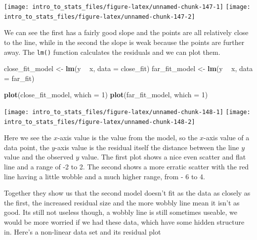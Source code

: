 \documentclass[
]{book}
\newenvironment{Shaded}{\begin{snugshade}}{\end{snugshade}}
\newcommand{\DataTypeTok}[1]{\textcolor[rgb]{0.13,0.29,0.53}{#1}}
\newcommand{\DecValTok}[1]{\textcolor[rgb]{0.00,0.00,0.81}{#1}}
\newcommand{\KeywordTok}[1]{\textcolor[rgb]{0.13,0.29,0.53}{\textbf{#1}}}
\newcommand{\NormalTok}[1]{#1}
\newcommand{\OperatorTok}[1]{\textcolor[rgb]{0.81,0.36,0.00}{\textbf{#1}}}
\newcommand{\StringTok}[1]{\textcolor[rgb]{0.31,0.60,0.02}{#1}}
\begin{document}
\texttt{[image: intro\_to\_stats\_files/figure-latex/unnamed-chunk-147-1]} \texttt{[image: intro\_to\_stats\_files/figure-latex/unnamed-chunk-147-2]}

We can see the first has a fairly good slope and the points are all relatively close to the line, while in the second the slope is weak because the points are further away. The \texttt{lm()} function calculates the residuals and we can plot them.

\begin{Shaded}
\begin{Highlighting}[]
\NormalTok{close_fit_model <-}\StringTok{ }\KeywordTok{lm}\NormalTok{(y }\OperatorTok{~}\StringTok{ }\NormalTok{x, }\DataTypeTok{data =}\NormalTok{ close_fit)}
\NormalTok{far_fit_model <-}\StringTok{ }\KeywordTok{lm}\NormalTok{(y }\OperatorTok{~}\StringTok{ }\NormalTok{x, }\DataTypeTok{data =}\NormalTok{ far_fit)}

\KeywordTok{plot}\NormalTok{(close_fit_model, }\DataTypeTok{which =} \DecValTok{1}\NormalTok{)}
\KeywordTok{plot}\NormalTok{(far_fit_model, }\DataTypeTok{which =} \DecValTok{1}\NormalTok{)}
\end{Highlighting}
\end{Shaded}

\texttt{[image: intro\_to\_stats\_files/figure-latex/unnamed-chunk-148-1]} \texttt{[image: intro\_to\_stats\_files/figure-latex/unnamed-chunk-148-2]}

Here we see the \(x\)-axis value is the value from the model, so the \(x\)-axis value of a data point, the \(y\)-axis value is the residual itself the distance between the line \(y\) value and the observed \(y\) value. The first plot shows a nice even scatter and flat line and a range of -2 to 2. The second shows a more erratic scatter with the red line having a little wobble and a much higher range, from - 6 to 4.

Together they show us that the second model doesn't fit as the data as closely as the first, the increased residual size and the more wobbly line mean it isn't as good. Its still not useless though, a wobbly line is still sometimes useable, we would be more worried if we had these data, which have some hidden structure in. Here's a non-linear data set and its residual plot
\end{document}

